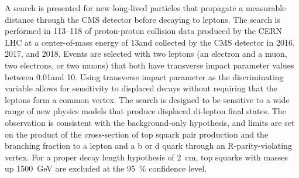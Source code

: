 
A search is presented for new long-lived particles that propagate a measurable distance through the CMS detector before decaying to leptons. The search is performed in 113--\SI{118}{\fb} of proton-proton collision data produced by the CERN LHC at a center-of-mass energy of 13\TeV and collected by the CMS detector in 2016, 2017, and 2018. Events are selected with two leptons (an electron and a muon, two electrons, or two muons) that both have transverse impact parameter values between 0.01\cm and 10\cm. Using transverse impact parameter as the discriminating variable allows for sensitivity to displaced decays without requiring that the leptons form a common vertex. The search is designed to be sensitive to a wide range of new physics models that produce displaced di-lepton final states. The observation is consistent with the background-only hypothesis, and limits are set on the product of the cross-section of top squark pair production and the branching fraction to a lepton and a b or d quark through an R-parity-violating vertex. For a proper decay length hypothesis of \SI{2}{\cm}, top squarks with masses up \SI{1500}{\GeV} are excluded at the \SI{95}{\percent} confidence level.

